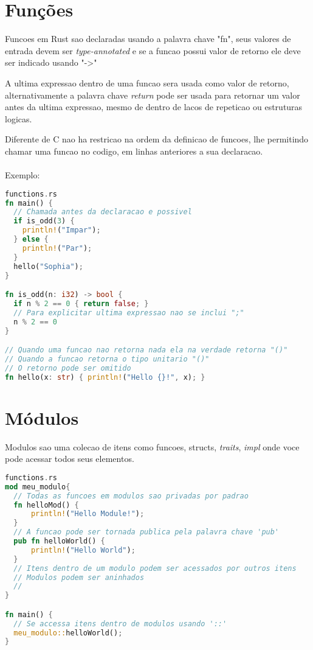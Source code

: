 \section{Fun\c{c}\~{o}es}

Funcoes em Rust sao declaradas usando a palavra chave "fn", seus valores de entrada devem ser \textit{type-annotated} e se a funcao possui valor de retorno ele deve ser indicado usando "->"
\par
A ultima expressao dentro de uma funcao sera usada como valor de retorno, alternativamente a palavra chave \textit{return} pode ser usada para retornar um valor antes da ultima expressao, mesmo de dentro de lacos de repeticao ou estruturas logicas.
\par Diferente de C nao ha restricao na ordem da definicao de funcoes, lhe permitindo chamar uma funcao no codigo, em linhas anteriores a sua declaracao.
\\
\\
{\huge Exemplo:}
\begin{lstlisting}[language=rust]
functions.rs
fn main() {
  // Chamada antes da declaracao e possivel  
  if is_odd(3) {
    println!("Impar");
  } else {
    println!("Par");
  }
  hello("Sophia");
}

fn is_odd(n: i32) -> bool {
  if n % 2 == 0 { return false; }
  // Para explicitar ultima expressao nao se inclui ";"
  n % 2 == 0
}

// Quando uma funcao nao retorna nada ela na verdade retorna "()"
// Quando a funcao retorna o tipo unitario "()"
// O retorno pode ser omitido
fn hello(x: str) { println!("Hello {}!", x); }
\end{lstlisting}

\pagebreak
\newpage

\section{M\'{o}dulos}

Modulos sao uma colecao de itens como funcoes, structs, \textit{traits}, \textit{impl} onde voce pode acessar todos seus elementos.

\begin{lstlisting}[language=rust]
functions.rs
mod meu_modulo{
  // Todas as funcoes em modulos sao privadas por padrao
  fn helloMod() {
      println!("Hello Module!");
  }
  // A funcao pode ser tornada publica pela palavra chave 'pub'
  pub fn helloWorld() {
      println!("Hello World");
  }
  // Itens dentro de um modulo podem ser acessados por outros itens
  // Modulos podem ser aninhados 
  //
}

fn main() {
  // Se accessa itens dentro de modulos usando '::'
  meu_modulo::helloWorld();
}
\end{lstlisting}

